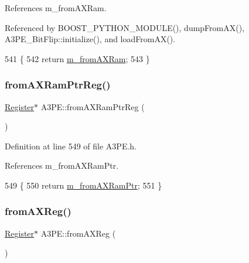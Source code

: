 References m\+\_\+from\+A\+X\+Ram.



Referenced by B\+O\+O\+S\+T\+\_\+\+P\+Y\+T\+H\+O\+N\+\_\+\+M\+O\+D\+U\+L\+E(), dump\+From\+A\+X(), A3\+P\+E\+\_\+\+Bit\+Flip\+::initialize(), and load\+From\+A\+X().


\begin{DoxyCode}
541                   \{
542     \textcolor{keywordflow}{return} \hyperlink{classA3PE_a91d3dd3e87e2c948dd67cb82a63d3858}{m\_fromAXRam};
543   \}
\end{DoxyCode}
\mbox{\label{classA3PE_aad21357e25e3d4e2bed779040de52e13}} 
\subsubsection{\texorpdfstring{from\+A\+X\+Ram\+Ptr\+Reg()}{fromAXRamPtrReg()}}
{\footnotesize\ttfamily \hyperlink{classRegister}{Register}$\ast$ A3\+P\+E\+::from\+A\+X\+Ram\+Ptr\+Reg (\begin{DoxyParamCaption}{ }\end{DoxyParamCaption})\hspace{0.3cm}{\ttfamily [inline]}}



Definition at line 549 of file A3\+P\+E.\+h.



References m\+\_\+from\+A\+X\+Ram\+Ptr.


\begin{DoxyCode}
549                              \{
550     \textcolor{keywordflow}{return} \hyperlink{classA3PE_a27ae9467bc128e46dd80443245df096a}{m\_fromAXRamPtr};
551   \}
\end{DoxyCode}
\mbox{\label{classA3PE_a0b2fabe7e7941f33de210d9385b7afce}} 
\subsubsection{\texorpdfstring{from\+A\+X\+Reg()}{fromAXReg()}}
{\footnotesize\ttfamily \hyperlink{classRegister}{Register}$\ast$ A3\+P\+E\+::from\+A\+X\+Reg (\begin{DoxyParamCaption}{ }\end{DoxyParamCaption})\hspace{0.3cm}{\ttfamily [inline]}}



